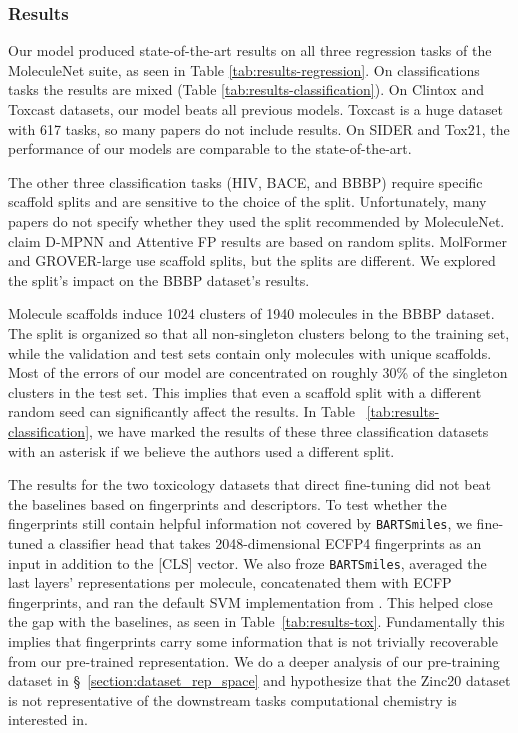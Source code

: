 \documentclass{article} %
\newcommand{\MODEL}{\texttt{BARTSmiles}}
\begin{document}
\vspace{-0.5em}
\subsubsection{Results}





Our model produced state-of-the-art results on all three regression tasks of the MoleculeNet suite, as seen in Table \ref{tab:results-regression}. %
On classifications tasks the results are mixed (Table \ref{tab:results-classification}). On Clintox and Toxcast datasets, our model beats all previous models. Toxcast is a huge dataset with 617 tasks, so many papers do not include results. On SIDER and Tox21, the performance of our models are comparable to the state-of-the-art. %

The other three classification tasks (HIV, BACE, and BBBP) require specific scaffold splits and are sensitive to the choice of the split. Unfortunately, many papers do not specify whether they used the split recommended by MoleculeNet.  %
\citet{GNN-drug-comparison} claim D-MPNN and Attentive FP results are based on random splits. MolFormer and GROVER-large use scaffold splits, but the splits are different.
We explored the split's impact on the BBBP dataset's results.

Molecule scaffolds induce 1024 clusters of 1940 molecules in the BBBP dataset. The split is organized so that all non-singleton clusters belong to the training set, while the validation and test sets contain only molecules with unique scaffolds. Most of the errors of our model are concentrated on roughly 30\% of the singleton clusters in the test set. This implies that even a scaffold split with a different random seed can significantly affect the results. In Table~ \ref{tab:results-classification}, we have marked the results of these three classification datasets with an asterisk if we believe the authors used a different split. 

The results for the two toxicology datasets that direct fine-tuning did not beat the baselines based on fingerprints and descriptors. To test whether the fingerprints still contain helpful information not covered by \MODEL{}, we fine-tuned a classifier head that takes 2048-dimensional ECFP4 fingerprints \citep{ECFP-fingerprints} as an input in addition to the [CLS] vector. We also froze \MODEL{}, averaged the last layers' representations per molecule, concatenated them with ECFP fingerprints, and ran the default SVM implementation from \citet{scikit}. This helped close the gap with the baselines, as seen in Table~\ref{tab:results-tox}. Fundamentally this implies that fingerprints carry some information that is not trivially recoverable from our pre-trained representation. We do a deeper analysis of our pre-training dataset in \S~\ref{section:dataset_rep_space} and hypothesize that the Zinc20 dataset is not representative of the downstream tasks computational chemistry is interested in.
\end{document}
